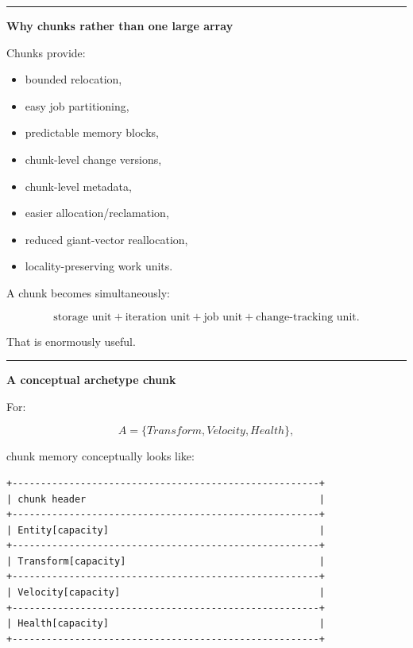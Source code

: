 \begin{center}\rule{0.5\linewidth}{0.5pt}\end{center}

\textbf{Why chunks rather than one large array}

Chunks provide:

\begin{itemize}
\tightlist
\item
  bounded relocation,
\item
  easy job partitioning,
\item
  predictable memory blocks,
\item
  chunk-level change versions,
\item
  chunk-level metadata,
\item
  easier allocation/reclamation,
\item
  reduced giant-vector reallocation,
\item
  locality-preserving work units.
\end{itemize}

A chunk becomes simultaneously:

\[
\boxed{
\text{storage unit}
+
\text{iteration unit}
+
\text{job unit}
+
\text{change-tracking unit}.
}
\]

That is enormously useful.

\begin{center}\rule{0.5\linewidth}{0.5pt}\end{center}

\textbf{A conceptual archetype chunk}

For:

\[
A=\{Transform,Velocity,Health\},
\]

chunk memory conceptually looks like:

\begin{verbatim}
+------------------------------------------------------+
| chunk header                                         |
+------------------------------------------------------+
| Entity[capacity]                                     |
+------------------------------------------------------+
| Transform[capacity]                                  |
+------------------------------------------------------+
| Velocity[capacity]                                   |
+------------------------------------------------------+
| Health[capacity]                                     |
+------------------------------------------------------+
\end{verbatim}

